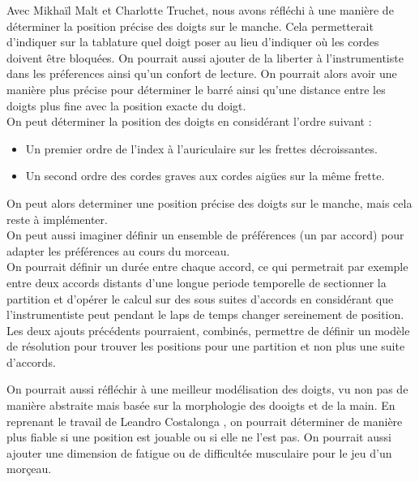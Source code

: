 Avec Mikhaïl Malt et Charlotte Truchet, nous avons réfléchi à une manière de
déterminer la position précise des doigts sur le manche. Cela permetterait 
d'indiquer sur la tablature quel doigt poser au lieu d'indiquer où les 
cordes doivent être bloquées. On pourrait aussi ajouter de la liberter
à l'instrumentiste dans les préferences ainsi qu'un confort de lecture.
On pourrait alors avoir une manière plus précise pour déterminer le barré ainsi
qu'une distance entre les doigts plus fine avec la position exacte du doigt.\\
On peut déterminer la position des doigts en considérant l'ordre suivant :
\begin{itemize}
  \item Un premier ordre de l'index à l'auriculaire sur les frettes
    décroissantes.
  \item Un second ordre des cordes graves aux cordes aigües sur la même frette.
\end{itemize}
On peut alors determiner une position précise des doigts sur le manche, mais
cela reste à implémenter.\\
On peut aussi imaginer définir un ensemble de préférences (un par accord) pour
adapter les préférences au cours du morceau.\\
On pourrait définir un durée entre chaque accord, ce qui
permetrait par exemple entre deux accords distants d'une longue periode
temporelle de sectionner la partition et d'opérer le calcul sur des sous suites
d'accords en considérant que l'instrumentiste peut pendant le laps de temps
changer sereinement de position.
Les deux ajouts précédents pourraient, combinés, permettre de définir un modèle
de résolution pour trouver les positions pour une partition et non plus une
suite d'accords.

On pourrait aussi réfléchir à une meilleur modélisation des doigts, vu non pas
de manière abstraite mais basée sur la morphologie des dooigts et de la main.
En reprenant le travail de Leandro Costalonga \cite{biomechanicalCostalonga}, 
on pourrait déterminer de manière plus fiable si une position est jouable ou 
si elle ne l'est pas.
On pourrait aussi ajouter une dimension de fatigue ou de difficultée musculaire
pour le jeu d'un morçeau.
\newpage
